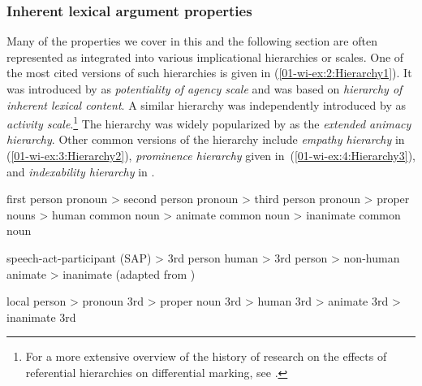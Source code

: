 \documentclass[output=paper]{LSP/langsci}
\begin{document}
\subsubsection{Inherent lexical argument properties}
\label{01-wi-sec:2.1.1-Inherent}

Many of the properties we cover in this and the following section are often represented as integrated into various implicational hierarchies or scales. 
One of the most cited versions of such hierarchies is given in (\ref{01-wi-ex:2:Hierarchy1}). 
It was introduced by \citet{Dixon1979Ergativity} as \textit{potentiality of agency scale} and was based on  \textit{hierarchy of inherent lexical content}. 
A similar hierarchy was independently introduced by \citet{Moravcsik1978Distribution} as \textit{activity scale}.\footnote{For a more extensive overview of the history of research on the effects of referential hierarchies on differential marking, see \citet{Filimonova2005Noun}.} 
The hierarchy was widely popularized by \citet[130]{Croft2003Typology} as the \textit{extended animacy hierarchy}. 
Other common versions of the hierarchy include  \textit{empathy hierarchy} in (\ref{01-wi-ex:3:Hierarchy2}),  \textit{prominence hierarchy} given in~(\ref{01-wi-ex:4:Hierarchy3}), and \textit{indexability hierarchy} in \citet{Bickeletal2007Inflectional}.

\ea\label{01-wi-ex:2:Hierarchy1}	
first person pronoun > second person pronoun > third person pronoun > proper nouns > human common noun > animate common noun > inanimate common noun \citep[85]{Dixon1979Ergativity}
\z

\ea\label{01-wi-ex:3:Hierarchy2}
speech-act-participant (SAP) > 3rd person human > 3rd person > non-human animate > inanimate (adapted from \citealt[627--628]{DeLancey1981Interpretation})
\z

\ea\label{01-wi-ex:4:Hierarchy3}
local person > pronoun 3rd > proper noun 3rd > human 3rd > animate 3rd > inanimate 3rd \citep[674]{Aissen1999Markedness}
\z
\end{document}
